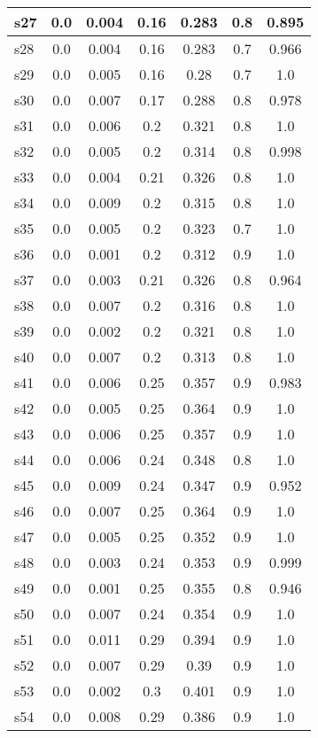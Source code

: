\documentclass{article}
\begin{document}
\begin{tabular}{|l|c|c|c|c|c|c|}
\hline
s27 &0.0 & 0.004 & 0.16 & 0.283 & 0.8 & 0.895\\
\hline
s28 &0.0 & 0.004 & 0.16 & 0.283 & 0.7 & 0.966\\
\hline
s29 &0.0 & 0.005 & 0.16 & 0.28 & 0.7 & 1.0\\
\hline
s30 &0.0 & 0.007 & 0.17 & 0.288 & 0.8 & 0.978\\
\hline
s31 &0.0 & 0.006 & 0.2 & 0.321 & 0.8 & 1.0\\
\hline
s32 &0.0 & 0.005 & 0.2 & 0.314 & 0.8 & 0.998\\
\hline
s33 &0.0 & 0.004 & 0.21 & 0.326 & 0.8 & 1.0\\
\hline
s34 &0.0 & 0.009 & 0.2 & 0.315 & 0.8 & 1.0\\
\hline
s35 &0.0 & 0.005 & 0.2 & 0.323 & 0.7 & 1.0\\
\hline
s36 &0.0 & 0.001 & 0.2 & 0.312 & 0.9 & 1.0\\
\hline
s37 &0.0 & 0.003 & 0.21 & 0.326 & 0.8 & 0.964\\
\hline
s38 &0.0 & 0.007 & 0.2 & 0.316 & 0.8 & 1.0\\
\hline
s39 &0.0 & 0.002 & 0.2 & 0.321 & 0.8 & 1.0\\
\hline
s40 &0.0 & 0.007 & 0.2 & 0.313 & 0.8 & 1.0\\
\hline
s41 &0.0 & 0.006 & 0.25 & 0.357 & 0.9 & 0.983\\
\hline
s42 &0.0 & 0.005 & 0.25 & 0.364 & 0.9 & 1.0\\
\hline
s43 &0.0 & 0.006 & 0.25 & 0.357 & 0.9 & 1.0\\
\hline
s44 &0.0 & 0.006 & 0.24 & 0.348 & 0.8 & 1.0\\
\hline
s45 &0.0 & 0.009 & 0.24 & 0.347 & 0.9 & 0.952\\
\hline
s46 &0.0 & 0.007 & 0.25 & 0.364 & 0.9 & 1.0\\
\hline
s47 &0.0 & 0.005 & 0.25 & 0.352 & 0.9 & 1.0\\
\hline
s48 &0.0 & 0.003 & 0.24 & 0.353 & 0.9 & 0.999\\
\hline
s49 &0.0 & 0.001 & 0.25 & 0.355 & 0.8 & 0.946\\
\hline
s50 &0.0 & 0.007 & 0.24 & 0.354 & 0.9 & 1.0\\
\hline
s51 &0.0 & 0.011 & 0.29 & 0.394 & 0.9 & 1.0\\
\hline
s52 &0.0 & 0.007 & 0.29 & 0.39 & 0.9 & 1.0\\
\hline
s53 &0.0 & 0.002 & 0.3 & 0.401 & 0.9 & 1.0\\
\hline
s54 &0.0 & 0.008 & 0.29 & 0.386 & 0.9 & 1.0\\

\end{tabular}
\end{document}
